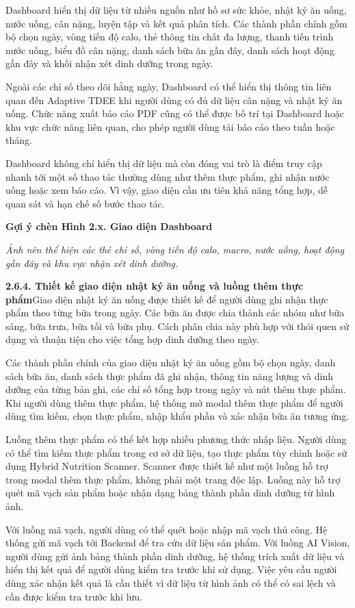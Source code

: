 Dashboard hiển thị dữ liệu từ nhiều nguồn như hồ sơ sức khỏe, nhật ký ăn uống, nước uống, cân nặng, luyện tập và kết quả phân tích. Các thành phần chính gồm bộ chọn ngày, vòng tiến độ calo, thẻ thông tin chất đa lượng, thanh tiến trình nước uống, biểu đồ cân nặng, danh sách bữa ăn gần đây, danh sách hoạt động gần đây và khối nhận xét dinh dưỡng trong ngày.

Ngoài các chỉ số theo dõi hằng ngày, Dashboard có thể hiển thị thông tin liên quan đến Adaptive TDEE khi người dùng có đủ dữ liệu cân nặng và nhật ký ăn uống. Chức năng xuất báo cáo PDF cũng có thể được bố trí tại Dashboard hoặc khu vực chức năng liên quan, cho phép người dùng tải báo cáo theo tuần hoặc tháng.

Dashboard không chỉ hiển thị dữ liệu mà còn đóng vai trò là điểm truy cập nhanh tới một số thao tác thường dùng như thêm thực phẩm, ghi nhận nước uống hoặc xem báo cáo. Vì vậy, giao diện cần ưu tiên khả năng tổng hợp, dễ quan sát và hạn chế số bước thao tác.

\textbf{Gợi ý chèn Hình 2.x. Giao diện Dashboard}

\textit{Ảnh nên thể hiện các thẻ chỉ số, vòng tiến độ calo, macro, nước uống, hoạt động gần đây và khu vực nhận xét dinh dưỡng.}

\textbf{2.6.4. Thiết kế giao diện nhật ký ăn uống và luồng thêm thực phẩm}Giao diện nhật ký ăn uống được thiết kế để người dùng ghi nhận thực phẩm theo từng bữa trong ngày. Các bữa ăn được chia thành các nhóm như bữa sáng, bữa trưa, bữa tối và bữa phụ. Cách phân chia này phù hợp với thói quen sử dụng và thuận tiện cho việc tổng hợp dinh dưỡng theo ngày.

Các thành phần chính của giao diện nhật ký ăn uống gồm bộ chọn ngày, danh sách bữa ăn, danh sách thực phẩm đã ghi nhận, thông tin năng lượng và dinh dưỡng của từng bản ghi, các chỉ số tổng hợp trong ngày và nút thêm thực phẩm. Khi người dùng thêm thực phẩm, hệ thống mở modal thêm thực phẩm để người dùng tìm kiếm, chọn thực phẩm, nhập khẩu phần và xác nhận bữa ăn tương ứng.

Luồng thêm thực phẩm có thể kết hợp nhiều phương thức nhập liệu. Người dùng có thể tìm kiếm thực phẩm trong cơ sở dữ liệu, tạo thực phẩm tùy chỉnh hoặc sử dụng Hybrid Nutrition Scanner. Scanner được thiết kế như một luồng hỗ trợ trong modal thêm thực phẩm, không phải một trang độc lập. Luồng này hỗ trợ quét mã vạch sản phẩm hoặc nhận dạng bảng thành phần dinh dưỡng từ hình ảnh.

Với luồng mã vạch, người dùng có thể quét hoặc nhập mã vạch thủ công. Hệ thống gửi mã vạch tới Backend để tra cứu dữ liệu sản phẩm. Với luồng AI Vision, người dùng gửi ảnh bảng thành phần dinh dưỡng, hệ thống trích xuất dữ liệu và hiển thị kết quả để người dùng kiểm tra trước khi sử dụng. Việc yêu cầu người dùng xác nhận kết quả là cần thiết vì dữ liệu từ hình ảnh có thể có sai lệch và cần được kiểm tra trước khi lưu.

